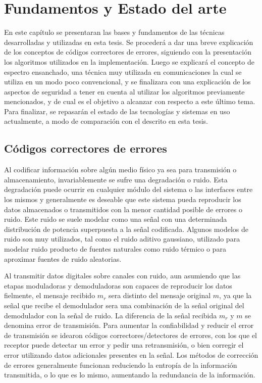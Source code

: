 \chapter{Fundamentos y Estado del arte}

En este capítulo se presentaran las bases y fundamentos de las técnicas desarrolladas y utilizadas en esta tesis. 
Se procederá a dar una breve explicación de los conceptos de códigos correctores de errores, siguiendo con la presentación los algoritmos utilizados en la implementación. Luego se explicará el concepto de espectro ensanchado, una técnica muy utilizada en comunicaciones la cual se utiliza en un modo poco convencional, y se finalizara con una explicación de los aspectos de seguridad a tener en cuenta al utilizar los algoritmos previamente mencionados, y de cual es el objetivo a alcanzar con respecto a este último tema.
Para finalizar, se repasarán el estado de las tecnologías y sistemas en uso actualmente, a modo de comparación con el descrito en esta tesis.

\section{Códigos correctores de errores}
Al codificar información sobre algún medio físico ya sea para transmisión o almacenamiento, invariablemente se sufre una degradación o ruido. Esta degradación puede ocurrir en cualquier módulo del sistema o las interfaces entre los mismos y generalmente es deseable que este sistema pueda reproducir los datos almacenados o transmitidos con la menor cantidad posible de errores o ruido. Este ruido se suele modelar como una señal con una determinada distribución de potencia superpuesta a la señal codificada. Algunos modelos de ruido son muy utilizados, tal como el ruido aditivo gaussiano, utilizado para modelar ruido producto de fuentes naturales como ruido térmico o para aproximar fuentes de ruido aleatorias.

Al transmitir datos digitales sobre canales con ruido, aun asumiendo que las etapas moduladoras y demoduladoras son capaces de reproducir los datos fielmente, el mensaje recibido $m_r$ sera distinto del mensaje original $m$, ya que la señal que recibe el demodulador sera una combinación de la señal original del demodulador con la señal de ruido. La diferencia de la señal recibida $m_r$ y $m$ se denomina error de transmisión. Para aumentar la confiabilidad y reducir el error de transmisión se idearon códigos correctores/detectores de errores, con los que el receptor puede detectar un error y pedir una retransmisión, o bien corregir el error utilizando datos adicionales presentes en la señal. Los métodos de corrección de errores generalmente funcionan reduciendo la entropía de la información transmitida, o lo que es lo mismo, aumentando la redundancia de la información.


